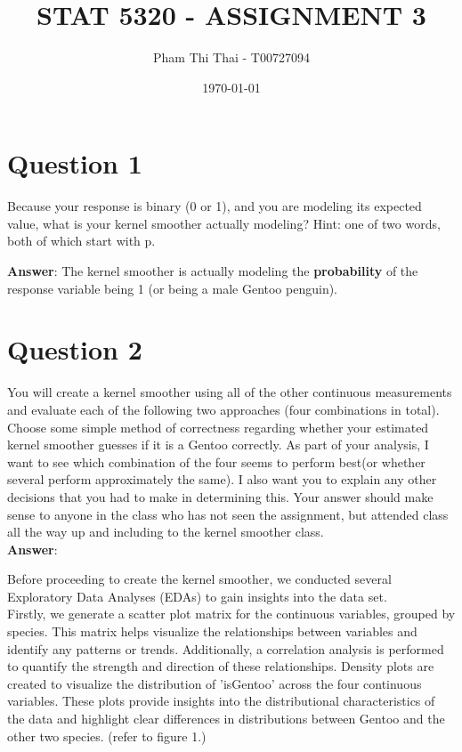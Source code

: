 \documentclass[12pt,doublespace]{article}
\begin{document}
	\title{ STAT 5320 - ASSIGNMENT 3}
	\author{Pham Thi Thai - T00727094}
	\date{\today}
	\maketitle
	
	\section* {Question 1}
	Because your response is binary (0 or 1), and you are modeling its expected value, what is your kernel smoother actually modeling? Hint: one of two words, both of which start
	with p.
	
	\textbf{Answer}:
	The kernel smoother is actually modeling the \textbf{probability} of the response variable being 1 (or being a male Gentoo penguin).
	
	\section* {Question 2}
	
	You will create a kernel smoother using all of the other continuous measurements and evaluate each of the following two approaches (four combinations in total). Choose some simple method of correctness regarding whether your estimated kernel smoother guesses if it is a Gentoo correctly. As part of your analysis, I want to see which combination of the four seems to perform best(or whether several perform approximately the same). I also want you to explain any other decisions that you had to make in determining this. Your answer should make sense to anyone in the class who has not seen the assignment, but attended class all the way up and including to the kernel smoother class.
		\\
	
	\textbf{Answer}:
	
	Before proceeding to create the kernel smoother, we conducted several Exploratory Data Analyses (EDAs) to gain insights into the data set. 
	\\
	
	Firstly, we generate a scatter plot matrix for the continuous variables, grouped by species. This matrix helps visualize the relationships between variables and identify any patterns or trends. Additionally, a correlation analysis is performed to quantify the strength and direction of these relationships. Density plots are created to visualize the distribution of 'isGentoo' across the four continuous variables. These plots provide insights into the distributional characteristics of the data and highlight clear differences in distributions between Gentoo and the other two species. (refer to figure 1.)
	\\
	
\end{document}
